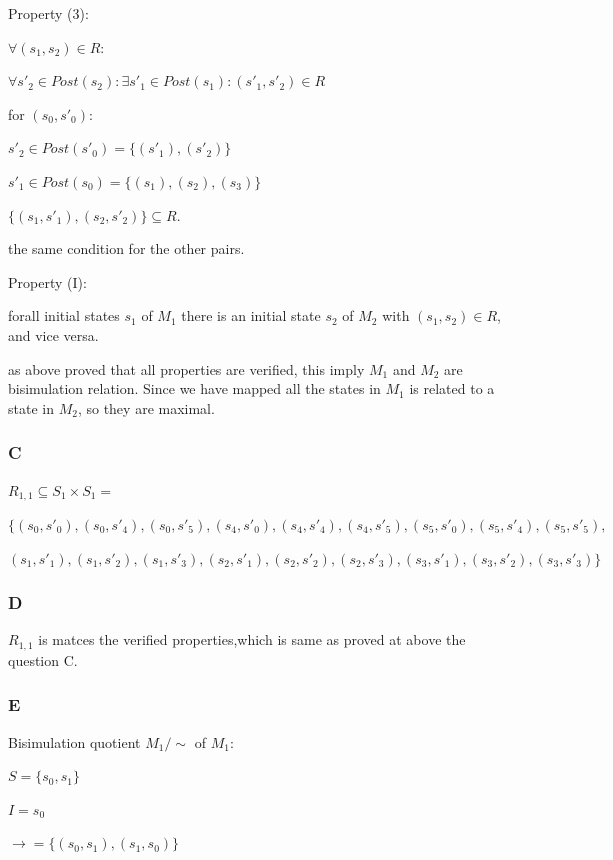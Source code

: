 \noindent
Property (3):

$\forall (s_1, s_2) \in R:$

$\forall s'_2 \in Post(s_2): \exists s'_1 \in Post(s_1): (s'_1, s'_2) \in R$

for $(s_0, s'_0):$

$s'_2 \in Post(s'_0)=\{(s'_1),(s'_2)\}$

$s'_1 \in Post(s_0)=\{(s_1),(s_2),(s_3)\}$

$\{(s_1,s'_1), (s_2,s'_2)\} \subseteq R.$

the same condition for the other pairs.

\indent

\noindent
Property (I):

forall initial states $s_1$ of $M_1$ there is an initial state $s_2$ of $M_2$ with $(s_1, s_2) \in R$, and vice versa.

\indent

\noindent
as above proved that all properties are verified, this imply $M_1$ and $M_2$ are bisimulation relation. Since we have mapped all the states in $M_1$ is related to a state in $M_2$, so they are maximal.

\subsubsection{C}

$R_{1,1} \subseteq S_1 \times S_1 = $

$\{(s_0,s'_0),(s_0, s'_4),(s_0, s'_5),(s_4,s'_0),(s_4,s'_4),(s_4,s'_5),(s_5,s'_0),(s_5,s'_4),(s_5,s'_5),$

$(s_1,s'_1),(s_1,s'_2),(s_1,s'_3),(s_2,s'_1),(s_2,s'_2),(s_2,s'_3),(s_3,s'_1),(s_3,s'_2),(s_3,s'_3)\}$

\subsubsection{D}

$R_{1,1}$ is matces the verified properties,which is same as proved at above the question C.

\subsubsection{E}

Bisimulation quotient $M_1/\sim$ of $M_1$:

$S = \{s_0, s_1\}$

$I = {s_0}$

$\rightarrow = \{(s_0, s_1), (s_1, s_0)\}$

